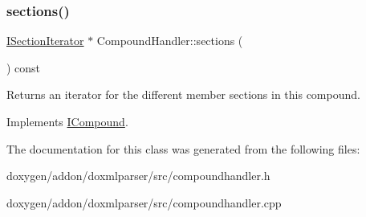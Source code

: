 \mbox{\label{class_compound_handler_ac692ed207cfa36644d6844e77d6d4fc2}} 
\subsubsection{\texorpdfstring{sections()}{sections()}}
{\footnotesize\ttfamily \mbox{\hyperlink{class_i_section_iterator}{I\+Section\+Iterator}} $\ast$ Compound\+Handler\+::sections (\begin{DoxyParamCaption}{ }\end{DoxyParamCaption}) const\hspace{0.3cm}{\ttfamily [virtual]}}

Returns an iterator for the different member sections in this compound. 

Implements \mbox{\hyperlink{class_i_compound_a966a7cac6a4f33f16ef869e74855ab3b}{I\+Compound}}.



The documentation for this class was generated from the following files\+:\begin{DoxyCompactItemize}
\item 
doxygen/addon/doxmlparser/src/compoundhandler.\+h\item 
doxygen/addon/doxmlparser/src/compoundhandler.\+cpp\end{DoxyCompactItemize}
